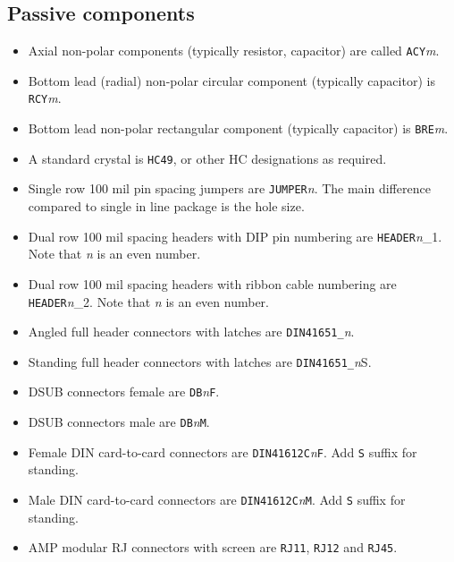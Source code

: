 \documentclass{article}
\begin{document}
\subsection{Passive components}
\begin{itemize}
\item   Axial non-polar components (typically resistor, capacitor) are
	called {\tt ACY}{\it m}.

\item   Bottom lead (radial) non-polar circular component (typically
	capacitor) is {\tt RCY}{\it m}.

\item   Bottom lead non-polar rectangular component (typically
	capacitor) is {\tt BRE}{\it m}.

\item   A standard crystal is {\tt HC49}, or other HC designations as 
	required.

\item   Single row 100 mil pin spacing jumpers are {\tt JUMPER}{\it n}. 
	The main difference compared to single in line package is the hole
	size.

\item   Dual row 100 mil spacing headers with DIP pin numbering
	are {\tt HEADER}{\it n}\_1. Note that {\it n} is an even number.

\item   Dual row 100 mil spacing headers with ribbon cable numbering
	are {\tt HEADER}{\it n}\_2. Note that {\it n} is an even number.

\item   Angled full header connectors with latches are 
	{\tt DIN41651\_}{\it n}.

\item   Standing full header connectors with latches are 
	{\tt DIN41651\_}{\it n}S.

\item   DSUB connectors female are {\tt DB}{\it n}{\tt F}.

\item   DSUB connectors male are {\tt DB}{\it n}{\tt M}.

\item   Female DIN card-to-card connectors are {\tt DIN41612C}{\it n}{\tt F}.
	Add {\tt S} suffix for standing.

\item   Male DIN card-to-card connectors are {\tt DIN41612C}{\it n}{\tt M}.
	Add {\tt S} suffix for standing.

\item   AMP modular RJ connectors with screen are {\tt RJ11}, {\tt RJ12} and
	{\tt RJ45}.
\end{itemize}
\end{document}
